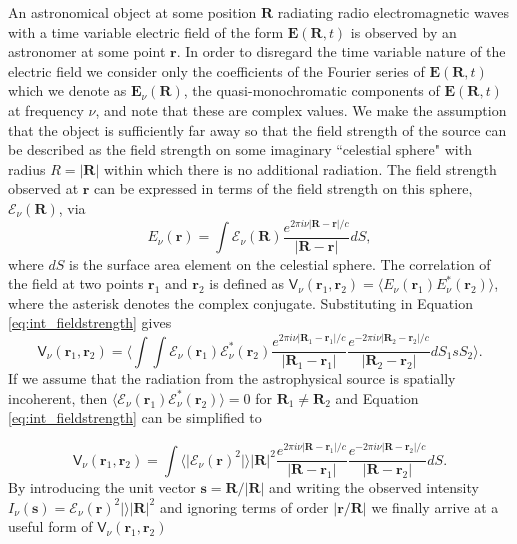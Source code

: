 An astronomical object at some position $\mathbf{R}$ radiating radio electromagnetic waves with a time variable electric field of the form $\mathbf{E}(\mathbf{R}, t)$ is observed by an astronomer at some point $\mathbf{r}$. In order to disregard the time variable nature of the electric field we consider only the coefficients of the Fourier series of $\mathbf{E}(\mathbf{R}, t)$ which we denote as $\mathbf{E}_\nu (\mathbf{R})$, the quasi-monochromatic components of $\mathbf{E}(\mathbf{R}, t)$ at frequency $\nu$, and note that these are complex values.	We make the assumption that the object is sufficiently far away so that the field strength of the source can be described as the field strength on some imaginary ``celestial sphere" with radius $R = \vert \mathbf{R} \vert$ within which there is no additional radiation. The field strength observed at $\mathbf{r}$ can be expressed in terms of the field strength on this sphere, $\mathcal{E}_\nu (\mathbf{R})$, via
\begin{equation}
\label{eq:int_fieldstrength}
E_\nu(\mathbf{r}) = \int \mathcal{E}_\nu (\mathbf{R}) \frac{e^{2\pi i \nu \vert \mathbf{R} - \mathbf{r} \vert/c}}{\vert \mathbf{R} - \mathbf{r} \vert} dS,
\end{equation}
where $dS$ is the surface area element on the celestial sphere. The correlation of the field at two points $\mathbf{r}_1$ and $\mathbf{r}_2$ is defined as $\mathsf{V}_\nu (\mathbf{r}_1, \mathbf{r}_2) = \langle E_\nu(\mathbf{r}_1) E^{*}_\nu(\mathbf{r}_2) \rangle$, where the asterisk denotes the complex conjugate. Substituting in Equation \ref{eq:int_fieldstrength} gives
\begin{equation}
\label{eq:int_correlation}
\mathsf{V}_\nu (\mathbf{r}_1, \mathbf{r}_2) = \bigg \langle \int \int \mathcal{E}_\nu(\mathbf{r}_1) \mathcal{E}^{*}_\nu(\mathbf{r}_2) 
\frac{e^{2\pi i \nu \vert \mathbf{R}_1 - \mathbf{r}_1 \vert/c}}{\vert \mathbf{R}_1 - \mathbf{r}_1 \vert} \frac{e^{-2\pi i \nu \vert \mathbf{R}_2 - \mathbf{r}_2 \vert/c}}{\vert \mathbf{R}_2 - \mathbf{r}_2 \vert} dS_1 sS_2 \bigg \rangle.
\end{equation}
If we assume that the radiation from the astrophysical source is spatially incoherent, then  $\langle \mathcal{E}_\nu(\mathbf{r}_1) \mathcal{E}^{*}_\nu(\mathbf{r}_2) \rangle = 0$ for $\mathbf{R}_1 \neq \mathbf{R}_2$ and Equation \ref{eq:int_fieldstrength} can be simplified to  

\begin{equation}
\label{eq:int_correlation2}
\mathsf{V}_\nu (\mathbf{r}_1, \mathbf{r}_2) =  \int \langle \vert \mathcal{E}_\nu(\mathbf{r})^2 \vert \rangle \vert \mathbf{R} \vert^2
\frac{e^{2\pi i \nu \vert \mathbf{R} - \mathbf{r}_1 \vert/c}}{\vert \mathbf{R} - \mathbf{r}_1 \vert} \frac{e^{-2\pi i \nu \vert \mathbf{R} - \mathbf{r}_2 \vert/c}}{\vert \mathbf{R} - \mathbf{r}_2 \vert} dS.
\end{equation}
By introducing the unit vector $\mathbf{s} = \mathbf{R}/ \vert \mathbf{R} \vert$ and writing the observed intensity $I_\nu(\mathbf{s}) = \mathcal{E}_\nu(\mathbf{r})^2 \vert \rangle \vert \mathbf{R} \vert^2$ and ignoring terms of order $\vert \mathbf{r}/\mathbf{R} \vert$ we finally arrive at a useful form of $\mathsf{V}_\nu (\mathbf{r}_1, \mathbf{r}_2)$

